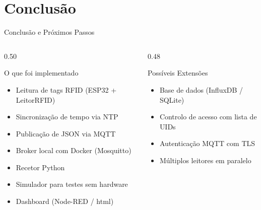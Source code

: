 \documentclass[aspectratio=169, 12pt]{beamer}
\begin{document}
  \section{Conclus\~{a}o}
  \begin{frame}{Conclus\~{a}o e Pr\'{o}ximos Passos}
    \begin{columns}[T]
      \begin{column}{0.50\textwidth}
        \begin{block}{O que foi implementado}
          \begin{itemize}
            \item[$\checkmark$] Leitura de tags RFID (ESP32 + LeitorRFID)
            \item[$\checkmark$] Sincroniza\c{c}\~{a}o de tempo via NTP
            \item[$\checkmark$] Publica\c{c}\~{a}o de JSON via MQTT
            \item[$\checkmark$] Broker local com Docker (Mosquitto)
            \item[$\checkmark$] Recetor Python
            \item[$\checkmark$] Simulador para testes sem hardware
            \item[$\checkmark$] Dashboard (Node-RED / html)
          \end{itemize}
        \end{block}
      \end{column}
      \begin{column}{0.48\textwidth}
        \begin{alertblock}{Poss\'{i}veis Extens\~{o}es}
          \begin{itemize}
            \item Base de dados (InfluxDB / SQLite)
            \item Controlo de acesso com lista de UIDs
            \item Autentica\c{c}\~{a}o MQTT com TLS
            \item M\'{u}ltiplos leitores em paralelo
          \end{itemize}
        \end{alertblock}
      \end{column}
    \end{columns}
    \vspace{0.7em}
    \centering
  \end{frame}
\end{document}

